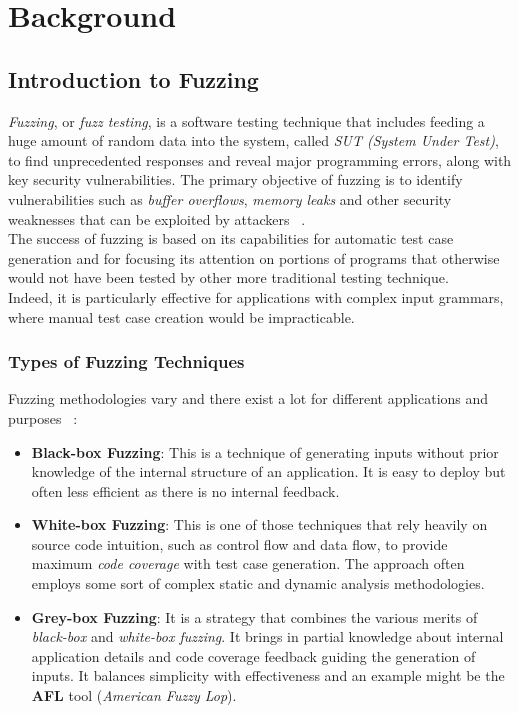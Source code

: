 \chapter{Background}

\section{Introduction to Fuzzing}

\textit{Fuzzing}, or \textit{fuzz testing}, is a software testing technique that includes feeding a huge amount of random data into the system, called \textit{SUT (System Under Test)}, to find unprecedented responses and reveal major programming errors, along with key security vulnerabilities. The primary objective of fuzzing is to identify vulnerabilities such as \textit{buffer overflows}, \textit{memory leaks} and other security weaknesses that can be exploited by attackers ~\cite{fuzzingprogresschallenges}.
\\The success of fuzzing is based on its capabilities for automatic test case generation and for focusing its attention on portions of programs that otherwise would not have been tested by other more traditional testing technique.
\\Indeed, it is particularly effective for applications with complex input grammars, where manual test case creation would be impracticable.

\subsection{Types of Fuzzing Techniques}
Fuzzing methodologies vary and there exist a lot for different applications and purposes ~\cite{statefulfuzzingcristian}:

\begin{itemize}
    \item \textbf{Black-box Fuzzing}: This is a technique of generating inputs without prior knowledge of the internal structure of an application. It is easy to deploy but often less efficient as there is no internal feedback.
    
    \item \textbf{White-box Fuzzing}: This is one of those techniques that rely heavily on source code intuition, such as control flow and data flow, to provide maximum \textit{code coverage} with test case generation. The approach often employs some sort of complex static and dynamic analysis methodologies.
    
    \item \textbf{Grey-box Fuzzing}: It is a strategy that combines the various merits of \textit{black-box} and \textit{white-box fuzzing}. It brings in partial knowledge about internal application details and code coverage feedback guiding the generation of inputs. It balances simplicity with effectiveness and an example might be the \textbf{AFL} tool (\textit{American Fuzzy Lop}).
\end{itemize}

